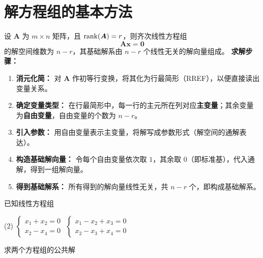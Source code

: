 \documentclass[12pt, a4paper, oneside, UTF8]{ctexbook}
\begin{document}
\section{解方程组的基本方法}
\begin{theorem}[基础解系的求法]
    设 $\bm{A}$ 为 $m\times n$ 矩阵，且 $\mathrm{rank}(\bm{A})=r$，则齐次线性方程组
    \[
    \bm{Ax}=\bm{0}
    \]
    的解空间维数为 $n-r$，其基础解系由 $n-r$ 个线性无关的解向量组成。
    \textbf{求解步骤：}
    \begin{enumerate}[label = (\arabic*)]
        \item \textbf{消元化简：}  
        对 $\bm{A}$ 作初等行变换，将其化为行最简形（RREF），以便直接读出变量关系。

        \item \textbf{确定变量类型：}  
        在行最简形中，每一行的主元所在列对应\textbf{主变量}；其余变量为\textbf{自由变量}，自由变量的个数为 $n-r$。

        \item \textbf{引入参数：}  
        用自由变量表示主变量，将解写成参数形式（解空间的通解表达）。

        \item \textbf{构造基础解向量：}  
        令每个自由变量依次取 $1$，其余取 $0$（即标准基），代入通解，得到一组解向量。

        \item \textbf{得到基础解系：}  
        所有得到的解向量线性无关，共 $n-r$ 个，即构成基础解系。
    \end{enumerate}
\end{theorem}
\begin{example}
    已知线性方程组
    \begin{tasks}[style = itemize,label = (\Roman*)](2)
    \task $\begin{cases}
        x_1+x_2=0\\
        x_2-x_4=0
    \end{cases}$
    \task $\begin{cases}
        x_1-x_2+x_3=0\\
        x_2-x_3+x_4=0
    \end{cases}$
    \end{tasks}
    求两个方程组的公共解
\end{example}
\end{document}
